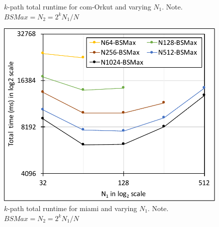 \begin{figure}[!htb]
\begin{minipage}{0.32\textwidth}
        \caption{$k$-path total runtime for com-Orkut and varying $N_1$. Note. $BSMax=N_2=2^kN_1/N$}
        \label{fig:fig-perf-kpath-orkut-k6-bsmax.pdf}
    \end{minipage}  
    \hspace{0mm}
    \begin{minipage}{0.32\textwidth}
        \centering
        \includegraphics[width=1\columnwidth]{img/kpath-N1N/fig-perf-kpath-miami-k6-bsmax.pdf}
        \caption{$k$-path total runtime for miami and varying $N_1$. Note. $BSMax=N_2=2^kN_1/N$}
        \label{fig:fig-perf-kpath-miami-k6-bsmax.pdf}
    \end{minipage}  
\end{figure}


